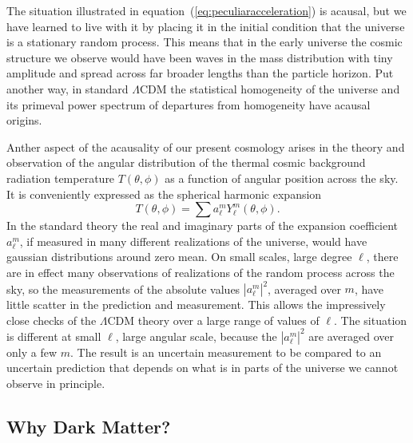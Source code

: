 \documentclass[fleqn,12pt]{article}
\newcommand{\beq}{\begin{equation}}
\newcommand{\eeq}{\end{equation}}
\begin{document}
The situation illustrated in equation~(\ref{eq:peculiaracceleration}) is acausal, but we have learned to live with it by placing it in the initial condition that the universe is a stationary random process. This means that in the early universe the cosmic structure we observe would have been waves in the mass distribution with tiny amplitude and spread across far broader lengths than the particle horizon. Put another way, in standard $\Lambda$CDM the statistical homogeneity of the universe and its primeval power spectrum of departures from homogeneity have acausal origins. 

Anther aspect of the acausality of our present cosmology arises in the theory and observation of the angular distribution of the thermal cosmic background radiation temperature $T(\theta, \phi)$ as a function of angular position across the sky. It is conveniently expressed as the spherical harmonic expansion 
\beq
T(\theta, \phi) = \sum a_\ell^mY_\ell^m(\theta, \phi). \label{eq:harmonicexp}
\eeq
In the standard theory the real and imaginary parts of the expansion coefficient $a_\ell^m$, if measured in many different realizations of the universe, would have gaussian distributions around zero mean. On small scales, large degree $\ell$, there are in effect many observations of realizations of the random process across the sky, so the measurements of the absolute values $|a_\ell^m|^2$, averaged over $m$, have little scatter in the prediction and  measurement. This allows the impressively close checks of the $\Lambda$CDM theory over a large range of values of $\ell$. The situation is different at small $\ell$, large angular scale, because the $|a_\ell^m|^2$ are averaged over only a few $m$. The result is an uncertain measurement to be compared to an uncertain prediction that depends on what is in parts of the universe we cannot observe in principle.

\subsection{Why Dark Matter?}\label{DM} 
\end{document}
